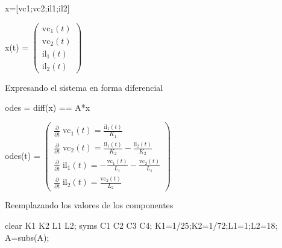 \documentclass[10pt,a4paper]{article} %
\begin{document}
\begin{matlabcode}
	x=[vc1;vc2;il1;il2]
\end{matlabcode}
\begin{matlabsymbolicoutput}
	x(t) = 
	$\displaystyle \left(\begin{array}{c}
	{\textrm{vc}}_1 \left(t\right)\\
	{\textrm{vc}}_2 \left(t\right)\\
	{\textrm{il}}_1 \left(t\right)\\
	{\textrm{il}}_2 \left(t\right)
	\end{array}\right)$
\end{matlabsymbolicoutput}

\begin{par}
	\begin{flushleft}
		Expresando el sistema en forma diferencial
	\end{flushleft}
\end{par}

\begin{matlabcode}
	odes = diff(x) == A*x
\end{matlabcode}
\begin{matlabsymbolicoutput}
	odes(t) = 
	$\displaystyle \left(\begin{array}{c}
	\frac{\partial }{\partial t}\;{\textrm{vc}}_1 \left(t\right)=\frac{{\textrm{il}}_1 \left(t\right)}{K_1 }\\
	\frac{\partial }{\partial t}\;{\textrm{vc}}_2 \left(t\right)=\frac{{\textrm{il}}_1 \left(t\right)}{K_2 }-\frac{{\textrm{il}}_2 \left(t\right)}{K_2 }\\
	\frac{\partial }{\partial t}\;{\textrm{il}}_1 \left(t\right)=-\frac{{\textrm{vc}}_1 \left(t\right)}{L_1 }-\frac{{\textrm{vc}}_2 \left(t\right)}{L_1 }\\
	\frac{\partial }{\partial t}\;{\textrm{il}}_2 \left(t\right)=\frac{{\textrm{vc}}_2 \left(t\right)}{L_2 }
	\end{array}\right)$
\end{matlabsymbolicoutput}

\begin{par}
	\begin{flushleft}
		Reemplazando los valores de los componentes
	\end{flushleft}
\end{par}

\begin{matlabcode}
	clear K1 K2 L1 L2;
	syms C1 C2 C3 C4;
	K1=1/25;K2=1/72;L1=1;L2=18;
	A=subs(A);
\end{matlabcode}
\end{document}
